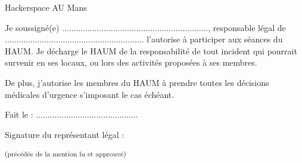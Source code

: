 \documentclass[11pt]{letter}
\begin{document}
\begin{letter}{Hackerspace AU Mans}
\opening{}

Je soussigné(e) ...............................................................,
responsable légal de ............................................................
l'autorise à participer aux séances du HAUM. Je décharge le HAUM de la responsabilité
de tout incident qui pourrait survenir en ses locaux, ou lors des activités proposées
à ses membres.

De plus, j'autorise les membres du HAUM à prendre toutes les décisions médicales
d'urgence s'imposant le cas échéant.


\bigskip{}
\bigskip{}

Fait le : ............................................

\bigskip{}
\bigskip{}

Signature du représentant légal :

\textsuperscript{(précédée de la mention lu et approuvé)}




\end{letter}
\end{document}
